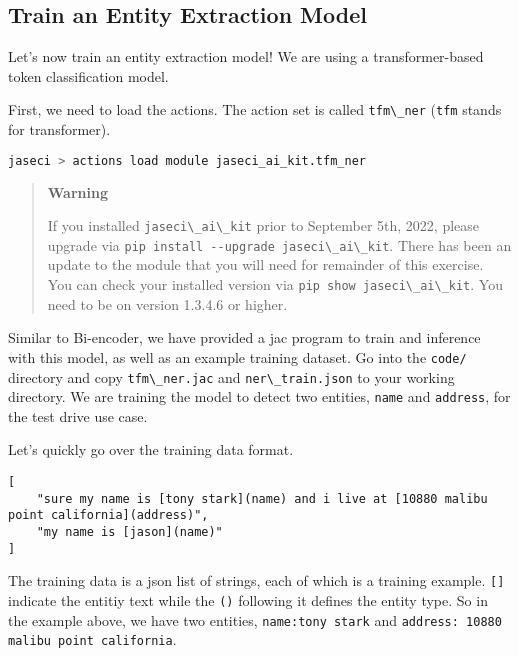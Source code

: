 \hypertarget{train-an-entity-extraction-model}{%
\subsection{Train an Entity Extraction
Model}\label{train-an-entity-extraction-model}}

Let's now train an entity extraction model! We are using a
transformer-based token classification model.

First, we need to load the actions. The action set is called
\passthrough{\lstinline!tfm\_ner!} (\passthrough{\lstinline!tfm!} stands
for transformer).

\begin{lstlisting}[language=bash]
jaseci > actions load module jaseci_ai_kit.tfm_ner
\end{lstlisting}

\begin{quote}
\textbf{Warning}

If you installed \passthrough{\lstinline!jaseci\_ai\_kit!} prior to
September 5th, 2022, please upgrade via
\passthrough{\lstinline!pip install --upgrade jaseci\_ai\_kit!}. There
has been an update to the module that you will need for remainder of
this exercise. You can check your installed version via
\passthrough{\lstinline!pip show jaseci\_ai\_kit!}. You need to be on
version 1.3.4.6 or higher.
\end{quote}

Similar to Bi-encoder, we have provided a jac program to train and
inference with this model, as well as an example training dataset. Go
into the \passthrough{\lstinline!code/!} directory and copy
\passthrough{\lstinline!tfm\_ner.jac!} and
\passthrough{\lstinline!ner\_train.json!} to your working directory. We
are training the model to detect two entities,
\passthrough{\lstinline!name!} and \passthrough{\lstinline!address!},
for the test drive use case.

Let's quickly go over the training data format.

\begin{lstlisting}
[
    "sure my name is [tony stark](name) and i live at [10880 malibu point california](address)",
    "my name is [jason](name)"
]
\end{lstlisting}

The training data is a json list of strings, each of which is a training
example. \passthrough{\lstinline![]!} indicate the entitiy text while
the \passthrough{\lstinline!()!} following it defines the entity type.
So in the example above, we have two entities,
\passthrough{\lstinline!name:tony stark!} and
\passthrough{\lstinline!address: 10880 malibu point california!}.

